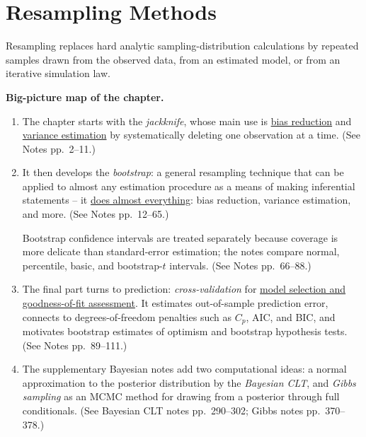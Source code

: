\section{Resampling Methods}
Resampling replaces hard analytic sampling-distribution calculations by repeated samples drawn from the observed data, from an estimated model, or from an iterative simulation law.

\begin{block}
\textbf{Big-picture map of the chapter.}
\begin{enumerate}
    \item The chapter starts with the \emph{jackknife}, whose main use is \underline{bias reduction} and \underline{variance estimation} by systematically deleting one observation at a time. (See Notes pp.~2--11.)
    \item It then develops the \emph{bootstrap}: a general resampling technique that can be applied to almost any estimation procedure as a means of making inferential statements -- it \underline{does almost everything}: bias reduction, variance estimation, and more. (See Notes pp.~12--65.)
    
    Bootstrap confidence intervals are treated separately because coverage is more delicate than standard-error estimation; the notes compare normal, percentile, basic, and bootstrap-$t$ intervals. (See Notes pp.~66--88.)
    \item The final part turns to prediction: \emph{cross-validation} for \underline{model selection and goodness-of-fit assessment}. It estimates out-of-sample prediction error, connects to degrees-of-freedom penalties such as $C_p$, AIC, and BIC, and motivates bootstrap estimates of optimism and bootstrap hypothesis tests. (See Notes pp.~89--111.)
    \item The supplementary Bayesian notes add two computational ideas: a normal approximation to the posterior distribution by the \emph{Bayesian CLT}, and \emph{Gibbs sampling} as an MCMC method for drawing from a posterior through full conditionals. (See Bayesian CLT notes pp.~290--302; Gibbs notes pp.~370--378.)
\end{enumerate}
\end{block}

